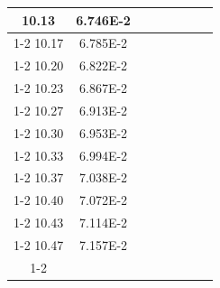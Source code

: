 \documentclass[article,12pt]{elsarticle}
\begin{document}
\begin{longtable}[c]{|c|c|cccccc}
10.13    & 6.746E-2  &                       &                              &                            &                       &                              &                               \\ \cline{1-2}
10.17    & 6.785E-2  &                       &                              &                            &                       &                              &                               \\ \cline{1-2}
10.20    & 6.822E-2  &                       &                              &                            &                       &                              &                               \\ \cline{1-2}
10.23    & 6.867E-2  &                       &                              &                            &                       &                              &                               \\ \cline{1-2}
10.27    & 6.913E-2  &                       &                              &                            &                       &                              &                               \\ \cline{1-2}
10.30    & 6.953E-2  &                       &                              &                            &                       &                              &                               \\ \cline{1-2}
10.33    & 6.994E-2  &                       &                              &                            &                       &                              &                               \\ \cline{1-2}
10.37    & 7.038E-2  &                       &                              &                            &                       &                              &                               \\ \cline{1-2}
10.40    & 7.072E-2  &                       &                              &                            &                       &                              &                               \\ \cline{1-2}
10.43    & 7.114E-2  &                       &                              &                            &                       &                              &                               \\ \cline{1-2}
10.47    & 7.157E-2  &                       &                              &                            &                       &                              &                               \\ \cline{1-2}

\end{longtable}
\end{document}
